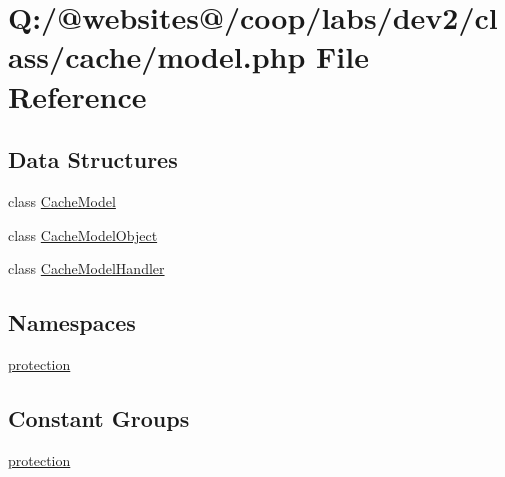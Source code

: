 \hypertarget{model_8php}{\section{Q\-:/@websites@/coop/labs/dev2/class/cache/model.php File Reference}
\label{model_8php}
}
\subsection*{Data Structures}
\begin{DoxyCompactItemize}
\item 
class \hyperlink{class_cache_model}{Cache\-Model}
\item 
class \hyperlink{class_cache_model_object}{Cache\-Model\-Object}
\item 
class \hyperlink{class_cache_model_handler}{Cache\-Model\-Handler}
\end{DoxyCompactItemize}
\subsection*{Namespaces}
\begin{DoxyCompactItemize}
\item 
\hyperlink{namespaceprotection}{protection}
\end{DoxyCompactItemize}
\subsection*{Constant Groups}
\begin{DoxyCompactItemize}
\item 
\hyperlink{namespaceprotection}{protection}
\end{DoxyCompactItemize}
